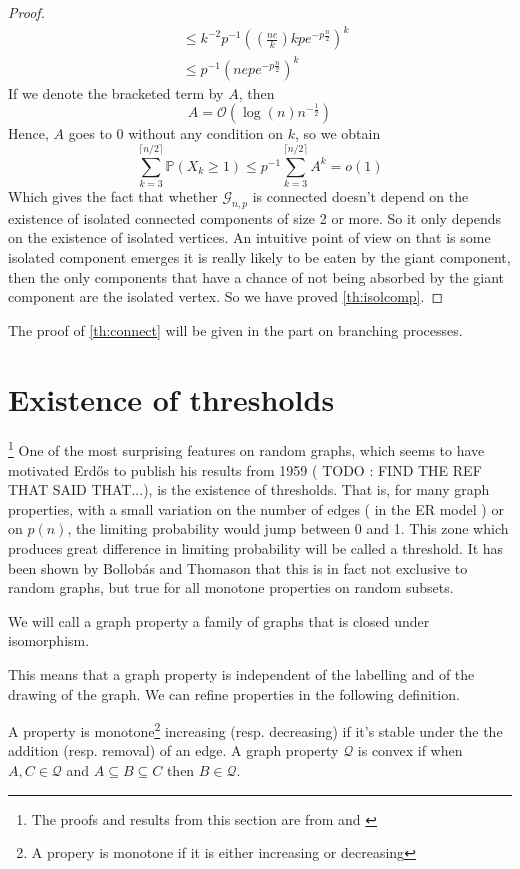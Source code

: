 \begin{proof}
\begin{align}
	            &\leq k^{-2}p^{-1}((\frac{ne}{k}) k p e^{-p\frac{n}{2}})^k\\
	            &\leq p^{-1}(nep e^{-p\frac{n}{2}})^k
\end{align}
If we denote the bracketed term by $A$, then
\begin{equation}
    A = \mathcal{O}(\log(n) n^{-\frac{1}{2}})
\end{equation}
Hence, $A$ goes to 0 without any condition on $k$, so we obtain
\begin{equation}
    \sum_{k=3}^{\lceil n/2\rceil} \mathbb{P}(X_k \geq 1)\leq p^{-1}\sum_{k=3}^{\lceil n/2\rceil} A^k = o(1)
\end{equation}
Which gives the fact that whether $\mathcal{G}_{n,p}$ is connected doesn't depend on the existence of isolated connected components of size 2 or more. So it only depends on the existence of isolated vertices.
An intuitive point of view on that is some isolated component emerges it is really likely to be eaten by the giant component, then the only components that have a chance of not being absorbed by the giant component are the isolated vertex.
So we have proved \ref{th:isolcomp}.
\end{proof}
The proof of \ref{th:connect} will be given in the part on branching processes.
\section{Existence of thresholds}\footnote{ The proofs and results from this section are from \cite{JLR} and \cite{Bollob01}}
One of the most surprising features on random graphs, which seems to have motivated Erd\H{o}s to publish his results from 1959 ( TODO : FIND THE REF THAT SAID THAT...), is the existence of thresholds. That is, for many graph properties, with a small variation on the number of edges ( in the ER model ) or on $p(n)$, the limiting probability would jump between 0 and 1.
This zone which produces great difference in limiting probability will be called a threshold.
It has been shown by Bollob\'as and Thomason \cite{Bollob87} that this is in fact not exclusive to random graphs, but true for all monotone properties on random subsets.
\begin{definition}
We will call a graph property a family of graphs that is closed under isomorphism.
\end{definition}
This means that a graph property is independent of the labelling and of the drawing of the graph.
We can refine properties in the following definition.
\begin{definition}
	A property is monotone\footnote{ A propery is monotone if it is either increasing or decreasing} increasing (resp. decreasing) if it's stable under the the addition (resp. removal) of an edge.
	A graph property $\mathcal{Q}$ is convex if when $ A,C \in \mathcal{Q}$ and $A\subseteq B\subseteq C$ then $B \in \mathcal{Q}$. 
\end{definition}

